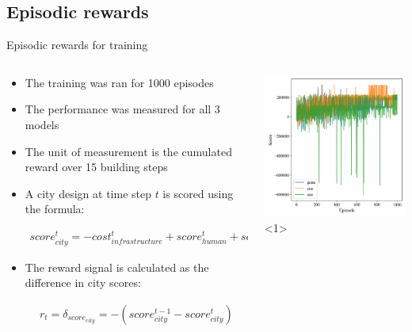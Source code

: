 \documentclass[english, aspectratio=169]{beamer}
\makeatletter
\let\origtableofcontents=\tableofcontents
\def\tableofcontents{\@ifnextchar[{\origtableofcontents}{\gobbletableofcontents}}
\def\gobbletableofcontents#1{\origtableofcontents}
\makeatother
\begin{document}
\begin{frame}
	\tableofcontents[currentsection]
\end{frame}

\subsection{Episodic rewards}


\begin{frame}{Episodic rewards for training}
\begin{columns}

\begin{column}{0.65\textwidth}
	\begin{itemize}
		\item The training was ran for 1000 episodes
		\item The performance was measured for all 3 models
		\item The unit of measurement is the cumulated reward over 15 building steps
		\item A city design at time step $t$ is scored using the formula:		
		
		\begin{scriptsize}		
		\begin{align*}
			score_{city}^{t}=-cost_{infrastructure}^{t}+score_{human}^{t}+score_{vehicular}^{t}
		\end{align*}	
		\end{scriptsize}		
			
		\item The reward signal is calculated as the difference in city scores:
		
		\begin{scriptsize}
		\begin{align*}		
			r_{t}=\delta_{score_{city}}=-(score_{city}^{t-1}-score_{city}^{t})
		\end{align*}				
		\end{scriptsize}

	\end{itemize}
\end{column}

\begin{column}{0.5\textwidth}
	\begin{center}

	\begin{scriptsize}
	
	\includegraphics[width=6.5cm, keepaspectratio]{images/scores_history_comparison_test_5_intersection}<1>	
	

\end{scriptsize}
\end{center}
\end{column}
\end{columns}
\end{frame}
\end{document}
